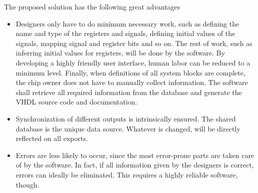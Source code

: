 The proposed solution has the following great advantages
\begin{itemize}
\item Designers only have to do minimum necessary work, such as defining the name and type of the registers and signals, defining initial values of the signals, mapping signal and register bits and so on. The rest of work, such as inferring initial values for registers, will be done by the software. By developing a highly friendly user interface, human labor can be reduced to a minimum level. Finally, when definitions of all system blocks are complete, the chip owner does not have to manually collect information. The software shall retrieve all required information from the database and generate the VHDL source code and documentation.
\item Synchronization of different outputs is intrinsically ensured. The shared database is the unique data source. Whatever is changed, will be directly reflected on all exports.
\item Errors are less likely to occur, since the most error-prone parts are taken care of by the software. In fact, if all information given by the designers is correct, errors can ideally be eliminated. This requires a highly reliable software, though.
\end{itemize}